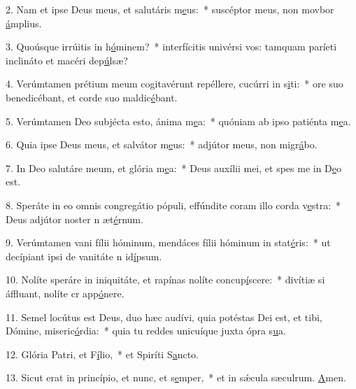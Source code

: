 2. Nam et ipse Deus meus, et salutáris m\uline{e}us:~* suscéptor meus, non movbor \uline{á}mplius.\par 
3. Quoúsque irrúitis in h\uline{ó}minem?~* interfícitis univérsi vos: tamquam paríeti inclináto et macéri dep\uline{ú}lsæ?\par 
4. Verúmtamen prétium meum cogitavérunt repéllere, cucúrri in s\uline{i}ti:~* ore suo benedicébant, et corde suo maldic\uline{é}bant.\par 
5. Verúmtamen Deo subjécta esto, ánima m\uline{e}a:~* quóniam ab ipso patiénta m\uline{e}a.\par 
6. Quia ipse Deus meus, et salvátor m\uline{e}us:~* adjútor meus, non migr\uline{á}bo.\par 
7. In Deo salutáre meum, et glória m\uline{e}a:~* Deus auxílii mei, et spes me in D\uline{e}o est.\par 
8. Speráte in eo omnis congregátio pópuli, effúndite coram illo corda v\uline{e}stra:~* Deus adjútor noster n æt\uline{é}rnum.\par 
9. Verúmtamen vani fílii hóminum, mendáces fílii hóminum in stat\uline{é}ris:~* ut decípiant ipsi de vanitáte n id\uline{í}psum.\par 
10. Nolíte speráre in iniquitáte, et rapínas nolíte concup\uline{í}scere:~* divítiæ si áffluant, nolíte cr app\uline{ó}nere.\par 
11. Semel locútus est Deus, duo hæc audívi, quia potéstas Dei est, et tibi, Dómine, miseric\uline{ó}rdia:~* quia tu reddes unicuíque juxta ópra s\uline{u}a.\par 
12. Glória Patri, et F\uline{í}lio,~* et Spiríti S\uline{a}ncto.\par 
13. Sicut erat in princípio, et nunc, et s\uline{e}mper,~* et in sǽcula sæculrum. \uline{A}men.\par 
